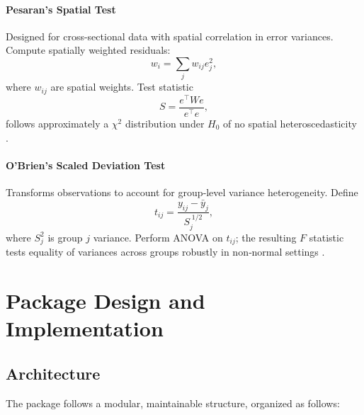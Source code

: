 \paragraph{Pesaran’s Spatial Test}\label{sec:pesaran}
Designed for cross-sectional data with spatial correlation in error variances. Compute spatially weighted residuals:
\[ w_i = \sum_{j} w_{ij} e_j^2, \]
where $w_{ij}$ are spatial weights. Test statistic
\[ S = \frac{e^\top W e}{e^\top e}, \]
follows approximately a $\chi^2$ distribution under $H_0$ of no spatial heteroscedasticity \citep{pesaran1997working}.

\paragraph{O’Brien’s Scaled Deviation Test}\label{sec:obrien-scaled}
Transforms observations to account for group‐level variance heterogeneity. Define
\[ t_{ij} = \frac{y_{ij} - \bar y_j}{S_j^{\;1/2}}, \]
where $S_j^2$ is group $j$ variance. Perform ANOVA on $t_{ij}$; the resulting $F$ statistic tests equality of variances across groups robustly in non‐normal settings \citep{obrien1979alternative}.


\section{Package Design and Implementation}\label{sec:design}

\subsection{Architecture}\label{sec:architecture}
The  package follows a modular, maintainable structure, organized as follows:

